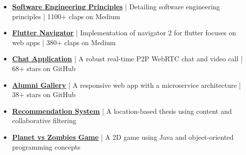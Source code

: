 \documentclass[letterpaper,11pt]{article}
\begin{document}


\begin{itemize}[leftmargin=*, noitemsep, topsep=0pt, partopsep=0pt]
      \item
            \href{https://medium.com/flutter-community/the-software-engineering-approach-in-cross-platform-programming-with-flutter-part-1-efcdc8a8fc26?source=friends_link&sk=ceb60f56685ce66c7f9574595748f25b}
            {\textbf{Software Engineering Principles}} | Detailing software engineering principles | 1100+ claps on Medium

      \item \BigGap
            \href{https://medium.com/flutter-community/lets-make-the-flutter-navigator-2-bc5953251c3e?source=friends_link&sk=e1ff30235ab93276b558c5b5ef1dd15f}
            {\textbf{Flutter Navigator}} | Implementation of navigator 2 for flutter focuses on web apps | 380+ claps on Medium

      \item \BigGap
            \href{https://github.com/aliyazdi75/flutter_chat}
            {\textbf{Chat Application}} | A robust real-time P2P WebRTC chat and video call | 68+ stars on GitHub

      \item \BigGap
            \href{https://gallery.yazdi.dev}
            {\textbf{Alumni Gallery}} | A responsive web app with a microservice architecture | 38+ stars on GitHub

      \item \BigGap
            \href{https://raw.githubusercontent.com/aliyazdi75/Resume/main/BScThesis-Abstract.pdf}
            {\textbf{Recommendation System}} | A location-based thesis using content and collaborative filtering

      \item \BigGap
            \href{https://github.com/aliyazdi75/Planet_vs_Zombies}
            {\textbf{Planet vs Zombies Game}} | A 2D game using Java and object-oriented programming concepts

\end{itemize}



\end{document}
